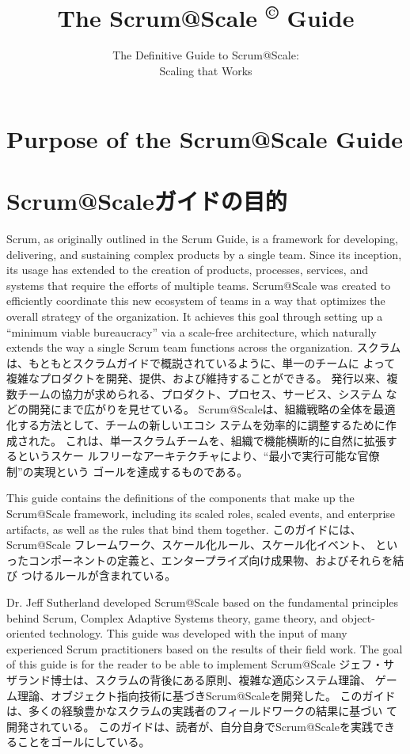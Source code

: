 \documentclass[12pt,a4paper,parskip=full]{scrartcl}
\title{\Huge{\color{red}\textbf{The Scrum@Scale
\textsuperscript{\copyright}
Guide}}}
\subtitle{\color{gray}The Definitive Guide to Scrum@Scale:\\ Scaling that
Works}
\date{}
\begin{document}

\section{Purpose of the Scrum@Scale Guide}
\fi
\section{Scrum@Scaleガイドの目的}
Scrum, as originally outlined in the Scrum Guide, is a framework for
developing, delivering, and sustaining complex products by a single team.
Since its inception, its usage has extended to the creation of products,
processes, services, and systems that require the efforts of multiple
teams. Scrum@Scale was created to efficiently coordinate this new ecosystem
of teams in a way that optimizes the overall strategy of the organization.
It achieves this goal through setting up a ``minimum viable bureaucracy''
via a scale-free architecture, which naturally extends the way a single
Scrum team functions across the organization.
\fi
スクラムは、もともとスクラムガイドで概説されているように、単一のチームに
よって複雑なプロダクトを開発、提供、および維持することができる。
発行以来、複数チームの協力が求められる、プロダクト、プロセス、サービス、システム
などの開発にまで広がりを見せている。
Scrum@Scaleは、組織戦略の全体を最適化する方法として、チームの新しいエコシ
ステムを効率的に調整するために作成された。
これは、単一スクラムチームを、組織で機能横断的に自然に拡張するというスケー
ルフリーなアーキテクチャにより、``最小で実行可能な官僚制''の実現という
ゴールを達成するものである。

This guide contains the definitions of the components that make up the
Scrum@Scale framework, including its scaled roles, scaled events, and
enterprise artifacts, as well as the rules that bind them together.
\fi
このガイドには、Scrum@Scale フレームワーク、スケール化ルール、スケール化イベント、
といったコンポーネントの定義と、エンタープライズ向け成果物、およびそれらを結び
つけるルールが含まれている。

Dr. Jeff Sutherland developed Scrum@Scale based on the fundamental
principles behind Scrum, Complex Adaptive Systems theory, game theory, and
object-oriented technology. This guide was developed with the input of many
experienced Scrum practitioners based on the results of their field work.
The goal of this guide is for the reader to be able to implement Scrum@Scale
\fi
ジェフ・サザランド博士は、スクラムの背後にある原則、複雑な適応システム理論、
ゲーム理論、オブジェクト指向技術に基づきScrum@Scaleを開発した。
このガイドは、多くの経験豊かなスクラムの実践者のフィールドワークの結果に基づい
て開発されている。
このガイドは、読者が、自分自身でScrum@Scaleを実践できることをゴールにしている。
\end{document}
